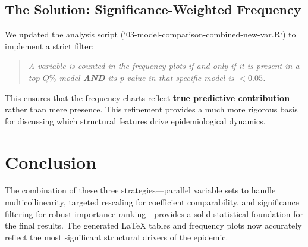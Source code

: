 \documentclass{article}
\begin{document}
\subsection{The Solution: Significance-Weighted Frequency}
We updated the analysis script (`03-model-comparison-combined-new-var.R`) to implement a strict filter:
\begin{quote}
    \textit{A variable is counted in the frequency plots if and only if it is present in a top $Q\%$ model \textbf{AND} its p-value in that specific model is $< 0.05$.}
\end{quote}
This ensures that the frequency charts reflect \textbf{true predictive contribution} rather than mere presence. This refinement provides a much more rigorous basis for discussing which structural features drive epidemiological dynamics.

\section{Conclusion}
The combination of these three strategies—parallel variable sets to handle multicollinearity, targeted rescaling for coefficient comparability, and significance filtering for robust importance ranking—provides a solid statistical foundation for the final results. The generated \LaTeX{} tables and frequency plots now accurately reflect the most significant structural drivers of the epidemic.
\end{document}
